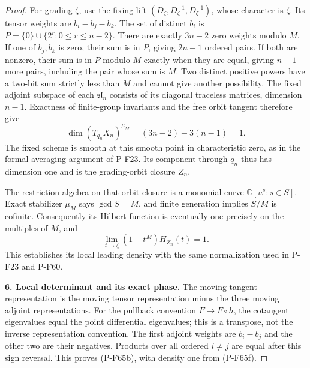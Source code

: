 \begin{proof}
For grading $\zeta$, use the fixing lift
$(D_\zeta,D_\zeta^{-1},D_\zeta^{-1})$, whose character is $\zeta$.
Its tensor weights are $b_i-b_j-b_k$.  The set of distinct
$b_i$ is $P=\{0\}\cup\{2^r:0\le r\le n-2\}$.  There are exactly $3n-2$ zero weights
modulo $M$.  If one of $b_j,b_k$ is zero, their sum is in $P$,
giving $2n-1$ ordered pairs.  If both are nonzero, their sum is
in $P$ modulo $M$ exactly when they are equal, giving $n-1$
more pairs, including the pair whose sum is $M$.
Two distinct positive powers have a two-bit sum strictly less
than $M$ and cannot give another possibility.
The fixed adjoint subspace of each $\mathfrak{sl}_n$ consists
of its diagonal traceless matrices, dimension $n-1$.
Exactness of finite-group invariants and the free orbit tangent
therefore give
\[
             \dim(T_{q_n}X_n)^{\mu_M}
                      =(3n-2)-3(n-1)=1.               \tag{P-F65e}
\]
The fixed scheme is smooth at this smooth point in characteristic
zero, as in the formal averaging argument of P-F23.
Its component through $q_n$ thus has dimension one and is the
grading-orbit closure $Z_n$.

The restriction algebra on that orbit closure is a monomial
curve $\mathbb C[u^s:s\in S]$.  Exact stabilizer $\mu_M$ says
$\gcd S=M$, and finite generation implies $S/M$ is cofinite.
Consequently its Hilbert function is eventually one precisely
on the multiples of $M$, and
\[
                 \lim_{t\to\zeta}(1-t^M)H_{Z_n}(t)=1. \tag{P-F65f}
\]
This establishes its local leading density with the same
normalization used in P-F23 and P-F60.

\par\medskip\noindent\textbf{6. Local determinant and its exact phase.}\quad 
The moving tangent representation is the moving tensor
representation minus the three moving adjoint representations.
For the pullback convention $F\mapsto F\circ h$, the cotangent
eigenvalues equal the point differential eigenvalues; this is
a transpose, not the inverse representation convention.
The first adjoint weights are $b_i-b_j$ and the other two are
their negatives.  Products over all ordered $i\ne j$ are equal
after this sign reversal.  This proves (P-F65b), with density
one from (P-F65f).


\end{proof}
